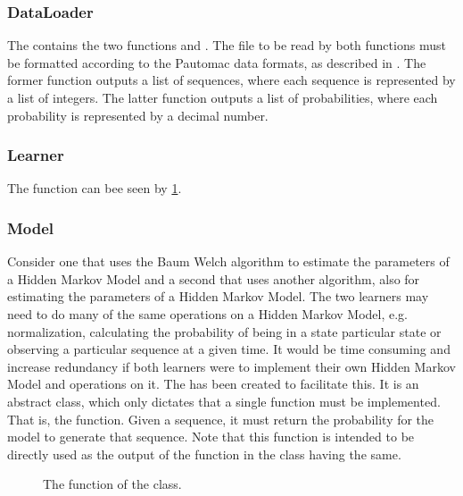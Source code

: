 \subsubsection{DataLoader}
The  contains the two functions  and . The file to be read by both functions must be formatted according to the Pautomac data formats, as described in . The former function outputs a list of sequences, where each sequence is represented by a list of integers.
The latter function outputs a list of probabilities, where each probability is represented by a decimal number.

\subsubsection{Learner}
The  function can bee seen by \ref{code:learner}.

\subsubsection{Model}
Consider one  that uses the Baum Welch algorithm to estimate the parameters of a Hidden Markov Model and a second  that uses another algorithm, also for estimating the parameters of a Hidden Markov Model. The two learners may need to do many of the same operations on a Hidden Markov Model, e.g. normalization, calculating the probability of being in a state particular state or observing a particular sequence at a given time. 
It would be time consuming and increase redundancy if both learners were to implement their own Hidden Markov Model and operations on it.
The  has been created to facilitate this. It is an abstract class, which only dictates that a single function must be implemented. That is, the  function. Given a sequence, it must return the probability for the model to generate that sequence. Note that this function is intended to be directly used as the output of the function in the  class having the same.

\begin{figure}
\caption{The  function of the  class.}
\label{code:learner}
\end{figure}